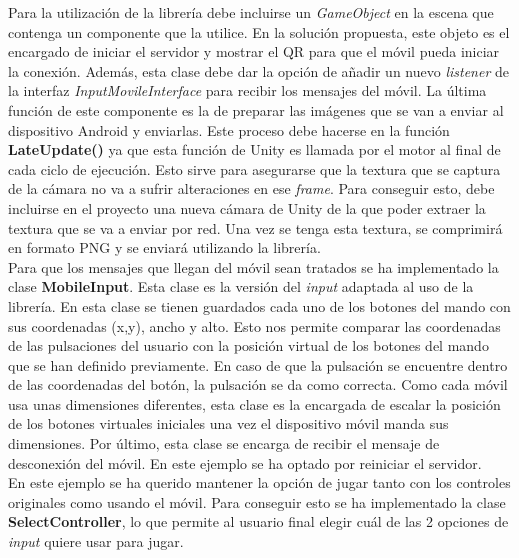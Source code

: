 Para la utilizaci\'on de la librer\'ia debe incluirse un \textit{GameObject} en la escena que contenga un componente que la utilice. En la soluci\'on propuesta, este objeto es el encargado de iniciar el servidor y mostrar el QR para que el m\'ovil pueda iniciar la conexi\'on. Adem\'as, esta clase debe dar la opci\'on de a\~nadir un nuevo \textit{listener} de la interfaz \textit{InputMovileInterface} para recibir los mensajes del m\'ovil. La \'ultima funci\'on de este componente es la de preparar las im\'agenes que se van a enviar al dispositivo Android y enviarlas. Este proceso debe hacerse en la funci\'on \textbf{LateUpdate()} ya que esta funci\'on de Unity es llamada por el motor al final de cada ciclo de ejecuci\'on. Esto sirve para asegurarse que la textura que se captura de la c\'amara no va a sufrir alteraciones en ese \textit{frame}. Para conseguir esto, debe incluirse en el proyecto una nueva c\'amara de Unity de la que poder extraer la textura que se va a enviar por red. Una vez se tenga esta textura, se comprimir\'a en formato PNG y se enviar\'a utilizando la librer\'ia.\\

Para que los mensajes que llegan del m\'ovil sean tratados se ha implementado la clase \textbf{MobileInput}. Esta clase es la versi\'on del \textit{input} adaptada al uso de la librer\'ia. En esta clase se tienen guardados cada uno de los botones del mando con sus coordenadas (x,y), ancho y alto. Esto nos permite comparar las coordenadas de las pulsaciones del usuario con la posici\'on virtual de los botones del mando que se han definido previamente. En caso de que la pulsaci\'on se encuentre dentro de las coordenadas del bot\'on, la pulsaci\'on se da como correcta. Como cada m\'ovil usa unas dimensiones diferentes, esta clase es la encargada de escalar la posici\'on de los botones virtuales iniciales una vez el dispositivo m\'ovil manda sus dimensiones. Por \'ultimo, esta clase se encarga de recibir el mensaje de desconexi\'on del m\'ovil. En este ejemplo se ha optado por reiniciar el servidor. \\

En este ejemplo se ha querido mantener la opci\'on de jugar tanto con los controles originales como usando el m\'ovil. Para conseguir esto se ha implementado la clase \textbf{SelectController}, lo que permite al usuario final elegir cu\'al de las 2 opciones de \textit{input} quiere usar para jugar. \\

